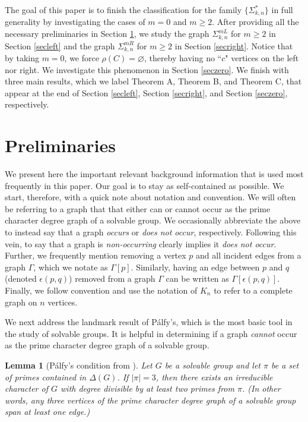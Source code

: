 \documentclass[11pt]{amsart}
\newtheorem{lemma}[theorem]{Lemma}
\theoremstyle{definition}
\theoremstyle{remark}
\numberwithin{equation}{section}
\newcommand{\SLR}[2]{\Sigma_{#1,#2}^*} %
\newcommand{\SLi}[3]{\Sigma_{#1,#2}^{#3L}} %
\newcommand{\SRi}[3]{\Sigma_{#1,#2}^{#3R}} %
\begin{document}
The goal of this paper is to finish the classification for the family $\{\SLR{k}{n}\}$ in full generality by investigating the cases of $m=0$ and $m\geq2$. After providing all the necessary preliminaries in Section \ref{secpre}, we study the graph $\SLi{k}{n}{m}$ for $m\geq2$ in Section \ref{secleft} and the graph $\SRi{k}{n}{m}$ for $m\geq2$ in Section \ref{secright}. Notice that by taking $m=0$, we force $\rho(C)=\varnothing$, thereby having no ``$c$" vertices on the left nor right. We investigate this phenomenon in Section \ref{seczero}. We finish with three main results, which we label Theorem A, Theorem B, and Theorem C, that appear at the end of Section \ref{secleft}, Section \ref{secright}, and Section \ref{seczero}, respectively.


\section{Preliminaries}\label{secpre}


We present here the important relevant background information that is used most frequently in this paper. Our goal is to stay as self-contained as possible. We start, therefore, with a quick note about notation and convention. We will often be referring to a graph that that either can or cannot occur as the prime character degree graph of a solvable group. We occasionally abbreviate the above to instead say that a graph \emph{occurs} or \emph{does not occur}, respectively. Following this vein, to say that a graph is \emph{non-occurring} clearly implies it \emph{does not occur}. Further, we frequently mention removing a vertex $p$ and all incident edges from a graph $\Gamma$, which we notate as $\Gamma[p]$. Similarly, having an edge between $p$ and $q$ (denoted $\epsilon(p,q)$) removed from a graph $\Gamma$ can be written as $\Gamma[\epsilon(p,q)]$. Finally, we follow convention and use the notation of $K_n$ to refer to a complete graph on $n$ vertices.

We next address the landmark result of P\'alfy's, which is the most basic tool in the study of solvable groups. It is helpful in determining if a graph \emph{cannot} occur as the prime character degree graph of a solvable group.

\begin{lemma}[P\'alfy's condition from \cite{P}]\label{PC}
Let $G$ be a solvable group and let $\pi$ be a set of primes contained in $\Delta(G)$. If $|\pi|=3$, then there exists an irreducible character of $G$ with degree divisible by at least two primes from $\pi$. (In other words, any three vertices of the prime character degree graph of a solvable group span at least one edge.)
\end{lemma}
\end{document}
